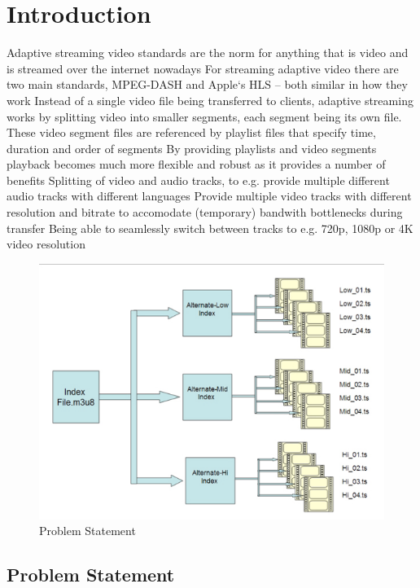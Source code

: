 \section{\textbf{Introduction}}\label{sec:Introduction}
Adaptive streaming video standards are the norm for anything that is video and is streamed over the internet nowadays
For streaming adaptive video there are two main standards, MPEG-DASH and Apple‘s HLS – both similar in how they work
Instead of a single video file being transferred to clients, adaptive streaming works by splitting video into smaller segments, each segment being its own file. These video segment files are referenced by playlist files that specify time, duration and order of segments
By providing playlists and video segments playback becomes much more flexible and robust as it provides a number of benefits
Splitting of video and audio tracks, to e.g. provide multiple different audio tracks with different languages
Provide multiple video tracks with different resolution and bitrate to accomodate (temporary) bandwith bottlenecks during transfer
Being able to seamlessly switch between tracks to e.g. 720p, 1080p or 4K video resolution

\begin{figure}

\centering
\includegraphics[scale=0.40]{figures/ProblemStatement.png}
\caption{Problem Statement \cite{rancy2016imt}}
\label{fig:IMT_2020_Use-cases}
\end{figure}


\subsection{Problem Statement
}\label{Problem Statement
}

